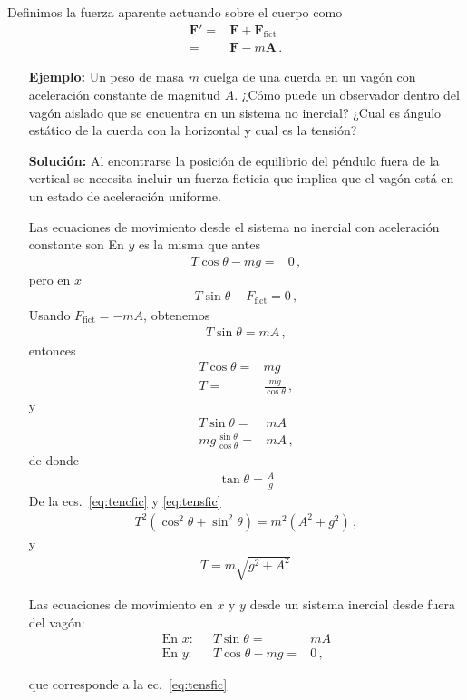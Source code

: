 \begin{frame}
Definimos la fuerza aparente actuando sobre el cuerpo como
\begin{align}
  \label{eq:fzaaparente}
  \mathbf{F}'=&\mathbf{F}+\mathbf{F}_{\text{fict}}\nonumber\\
  =&\mathbf{F}-m\mathbf{A}\,.
\end{align}
\end{frame}


\begin{itemize}
\item[\textbf{Ejemplo:}] Un peso de masa $m$ cuelga de una cuerda en un vagón con aceleración constante de magnitud $A$. ¿Cómo puede un observador dentro del vagón aislado que se encuentra en un sistema no inercial? ¿Cual es ángulo estático de la cuerda con la horizontal y cual es la tensión?

\item[\textbf{Solución:}] 
Al encontrarse la posición de equilibrio del péndulo fuera de la vertical se necesita incluir un fuerza ficticia que implica que el vagón está en un estado de aceleración uniforme.



Las ecuaciones de movimiento desde el sistema no inercial con aceleración constante son
En $y$ es la misma que antes
\begin{align*}
  T\cos\theta-mg=&0\,,
\end{align*}
pero en $x$
\begin{align*}
    T\sin\theta+F_{\text{fict}}=0\,,
\end{align*}
Usando $F_{\text{fict}}=-m A$, obtenemos
\begin{align*}
  T\sin\theta=m A\,,
\end{align*}
entonces
\begin{align}
  \label{eq:tencfic}
  T\cos\theta=&mg\nonumber\\
  T=&\frac{m g}{\cos\theta}\,,
\end{align}
y
\begin{align}
  \label{eq:tensfic}
  T\sin\theta=&m A\nonumber\\
  {m g}\frac{\sin\theta}{\cos\theta}=&mA\,,
\end{align}
de donde
\begin{align*}
  \tan\theta=\frac{A}{g}
\end{align*}
De la ecs.~\eqref{eq:tencfic} y \eqref{eq:tensfic}
\begin{align*}
  T^2(\cos^2\theta+\sin^2\theta)=m^2(A^2+g^2)\,,
\end{align*}
y
\begin{align*}
  T=m\sqrt{g^2+A^2}\,
\end{align*}

Las ecuaciones de movimiento en $x$ y $y$ desde un sistema inercial desde fuera del vagón:
\begin{align*}
  \text{En $x$:}&&T\sin\theta=&m A\nonumber\\
  \text{En $y$:}&&T\cos\theta-m g=&0\,,
\end{align*}

que corresponde a la ec.~\eqref{eq:tensfic}
\end{itemize}



